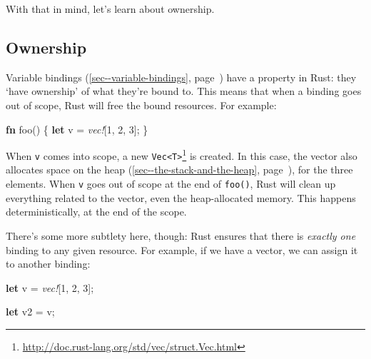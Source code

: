 \documentclass[a4paper,]{book}
\renewcommand*{\hyperref}[2][\ar]{%
  \def\ar{#2}%
  #2 (\autoref{#1}, page~\pageref{#1})}
\newenvironment{Shaded}{\begin{snugshade}}{\end{snugshade}}
\newcommand{\KeywordTok}[1]{\textcolor[rgb]{0.13,0.29,0.53}{\textbf{{#1}}}}
\newcommand{\DecValTok}[1]{\textcolor[rgb]{0.00,0.00,0.81}{{#1}}}
\newcommand{\PreprocessorTok}[1]{\textcolor[rgb]{0.56,0.35,0.01}{\textit{{#1}}}}
\newcommand{\NormalTok}[1]{{#1}}
\renewcommand{\href}[2]{#2\footnote{\url{#1}}}
\begin{document}
With that in mind, let's learn about ownership.

\subsection{Ownership}\label{ownership}

\hyperref[sec--variable-bindings]{Variable bindings} have a property in
Rust: they `have ownership' of what they're bound to. This means that
when a binding goes out of scope, Rust will free the bound resources.
For example:

\begin{Shaded}
\begin{Highlighting}[]
\KeywordTok{fn} \NormalTok{foo() \{}
    \KeywordTok{let} \NormalTok{v = }\PreprocessorTok{vec!}\NormalTok{[}\DecValTok{1}\NormalTok{, }\DecValTok{2}\NormalTok{, }\DecValTok{3}\NormalTok{];}
\NormalTok{\}}
\end{Highlighting}
\end{Shaded}

When \texttt{v} comes into scope, a new
\href{http://doc.rust-lang.org/std/vec/struct.Vec.html}{\texttt{Vec\textless{}T\textgreater{}}}
is created. In this case, the vector also allocates space on
\hyperref[sec--the-stack-and-the-heap]{the heap}, for the three
elements. When \texttt{v} goes out of scope at the end of
\texttt{foo()}, Rust will clean up everything related to the vector,
even the heap-allocated memory. This happens deterministically, at the
end of the scope.


There's some more subtlety here, though: Rust ensures that there is
\emph{exactly one} binding to any given resource. For example, if we
have a vector, we can assign it to another binding:

\begin{Shaded}
\begin{Highlighting}[]
\KeywordTok{let} \NormalTok{v = }\PreprocessorTok{vec!}\NormalTok{[}\DecValTok{1}\NormalTok{, }\DecValTok{2}\NormalTok{, }\DecValTok{3}\NormalTok{];}

\KeywordTok{let} \NormalTok{v2 = v;}
\end{Highlighting}
\end{Shaded}
\end{document}
